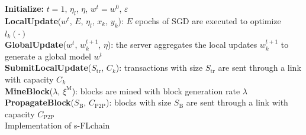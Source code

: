 \documentclass[10pt,journal,compsoc]{IEEEtran}
\begin{document}
\begin{algorithm}[ht!]	
	\SetAlgoLined
	\textbf{Initialize:} $t=1$, $\eta_l$, $\eta$, $w^t = w^0$, $\varepsilon$\\
	\textbf{LocalUpdate}($w^t$, $E$, $\eta_l$, $x_k$, $y_k$): $E$ epochs of SGD are executed to optimize $l_k(\cdot)$\\
	\textbf{GlobalUpdate}($w^t$, $w_k^{t+1}$, $\eta$): the server aggregates the local updates $w_k^{t+1}$ to generate a global model $w^t$ \\
	\textbf{SubmitLocalUpdate}($S_\text{tr}$, $C^{}_k$): transactions with size $S_\text{tr}$ are sent through a link with capacity $C^{}_k$\\
	\textbf{MineBlock}($\lambda$, $\xi^\text{M}$): blocks are mined with block generation rate $\lambda$\\
	\textbf{PropagateBlock}($S_\text{B}$, $C_\text{P2P}$): blocks with size $S_\text{B}$ are sent through a link with capacity $C_\text{P2P}$\\
	\caption{Implementation of s-FLchain}
	\label{alg:sflchain}			
\end{algorithm}
\end{document}

